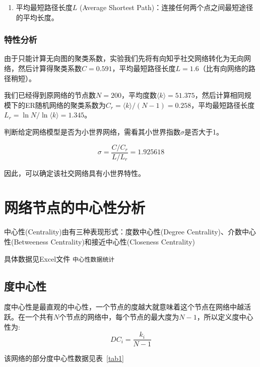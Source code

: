 \documentclass[a4paper]{article}
\begin{document}
\begin{spacing}{1.5}
\begin{enumerate}
\item
平均最短路径长度$L$ (Average Shortest Path)：连接任何两个点之间最短途径的平均长度。
\end{enumerate}
\subsubsection{特性分析}
由于只能计算无向图的聚类系数，实验我们先将有向知乎社交网络转化为无向网络，然后计算得聚类系数$C= 0.591$，平均最短路径长度$L=1.6$（比有向网络的路径稍短）。

我们已经得到原网络的节点数$N=200$，平均度数$\langle k\rangle= 51.375$，然后计算相同规模下的ER随机网络的聚类系数为$C_{r}=\langle k\rangle/(N-1)=0.258$，平均最短路径长度$L_{r}=\ln N/\ln \langle k\rangle=1.345$。

判断给定网络模型是否为小世界网络，需看其小世界指数$\sigma$是否大于1。

\[\sigma=\dfrac{C/C_r}{L/L_r}= 1.925618\]

因此，可以确定该社交网络具有小世界特性。


\newpage
\section{网络节点的中心性分析}\label{sec4}
中心性(Centrality)由有三种表现形式：度数中心性(Degree Centrality)、介数中心性(Betweeness Centrality)和接近中心性(Closeness Centrality)

具体数据见Excel文件 \verb"中心性数据统计"
\subsection{度中心性}
度中心性是最直观的中心性，一个节点的度越大就意味着这个节点在网络中越活跃。在一个共有$N$个节点的网络中，每个节点的最大度为$N-1$，所以定义度中心性为:
\[D{C_i} = \frac{{{k_i}}}{{N - 1}}\]

该网络的部分度中心性数据见表~\ref{tab1}


\end{spacing}
\end{document}

